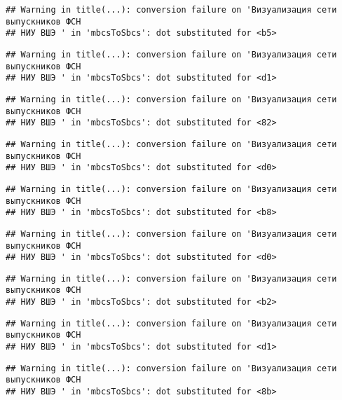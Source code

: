 \documentclass[
]{article}
\begin{document}
\begin{verbatim}
## Warning in title(...): conversion failure on 'Визуализация сети выпускников ФСН
## НИУ ВШЭ ' in 'mbcsToSbcs': dot substituted for <b5>
\end{verbatim}

\begin{verbatim}
## Warning in title(...): conversion failure on 'Визуализация сети выпускников ФСН
## НИУ ВШЭ ' in 'mbcsToSbcs': dot substituted for <d1>
\end{verbatim}

\begin{verbatim}
## Warning in title(...): conversion failure on 'Визуализация сети выпускников ФСН
## НИУ ВШЭ ' in 'mbcsToSbcs': dot substituted for <82>
\end{verbatim}

\begin{verbatim}
## Warning in title(...): conversion failure on 'Визуализация сети выпускников ФСН
## НИУ ВШЭ ' in 'mbcsToSbcs': dot substituted for <d0>
\end{verbatim}

\begin{verbatim}
## Warning in title(...): conversion failure on 'Визуализация сети выпускников ФСН
## НИУ ВШЭ ' in 'mbcsToSbcs': dot substituted for <b8>
\end{verbatim}

\begin{verbatim}
## Warning in title(...): conversion failure on 'Визуализация сети выпускников ФСН
## НИУ ВШЭ ' in 'mbcsToSbcs': dot substituted for <d0>
\end{verbatim}

\begin{verbatim}
## Warning in title(...): conversion failure on 'Визуализация сети выпускников ФСН
## НИУ ВШЭ ' in 'mbcsToSbcs': dot substituted for <b2>
\end{verbatim}

\begin{verbatim}
## Warning in title(...): conversion failure on 'Визуализация сети выпускников ФСН
## НИУ ВШЭ ' in 'mbcsToSbcs': dot substituted for <d1>
\end{verbatim}

\begin{verbatim}
## Warning in title(...): conversion failure on 'Визуализация сети выпускников ФСН
## НИУ ВШЭ ' in 'mbcsToSbcs': dot substituted for <8b>
\end{verbatim}
\end{document}
